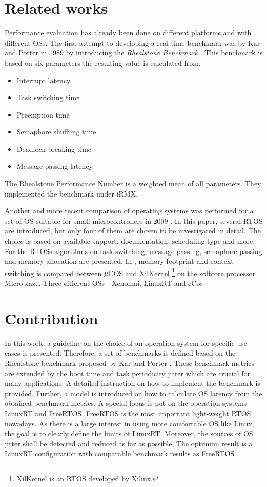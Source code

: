 \section{Related works}
Performance evaluation has already been done on different platforms and with different \acp{OS}. 
The first attempt to developing a real-time benchmark was by Kar and Porter in 1989 by introducing the \textit{Rhealstone Benchmark} \cite{kar:itrb} \cite{kar:artbp}. 
This benchmark is based on six parameters the resulting value is calculated from: 
\begin{itemize}
	\item Interrupt latency
	\item Task switching time
	\item Preemption time
	\item Semaphore shuffling time
	\item Deadlock breaking time
	\item Message passing latency
\end{itemize}
The Rhealstone Performance Number is a weighted mean of all parameters. They implemented the benchmark under iRMX.
\par
Another and more recent comparison of operating systems was performed for a set of \ac{OS} suitable for small microcontrollers in 2009 \cite{Anh:sapeortosfsm}. 
In this paper, several \ac{RTOS} are introduced, but only four of them are chosen to be investigated in detail.
The choice is based on available support, documentation, scheduling type and more. 
For the \acp{RTOS} algorithms on task switching, message passing, semaphore passing and memory allocation are presented.  
In \cite{gokhan:cstamfcoxamom}, memory footprint and context switching is compared between $\mu$COS and XilKernel \footnote{XilKernel \cite{xilinx:xilkernel} is an \ac{RTOS} developed by Xilinx.} on the softcore processor Microblaze.
Three different \acp{OS} - Xenomai, LinuxRT and eCos \cite{ecos} - 

 


\section{Contribution}
In this work, a guideline on the choice of an operation system for specific use cases is presented.
Therefore, a set of benchmarks is defined based on the Rhealstone benchmark proposed by Kar and Porter \cite{kar:itrb} \cite{kar:artbp}. 
These benchmark metrics are extended by the boot time and task periodicity jitter which are crucial for many applications.
A detailed instruction on how to implement the benchmark is provided.
Further, a model is introduced on how to calculate OS latency from the obtained benchmark metrics. 
A special focus is put on the operation systems LinuxRT and FreeRTOS. 
FreeRTOS is the most important light-weight \ac{RTOS} nowadays.
As there is a large interest in using more comfortable \ac{OS} like Linux, the goal is to clearly define the limits of LinuxRT.
Moreover, the sources of OS jitter shall be detected and reduced as far as possible. 
The optimum result is a LinuxRT configuration with comparable benchmark results as FreeRTOS. 




 

   
   
 





 
  

        
